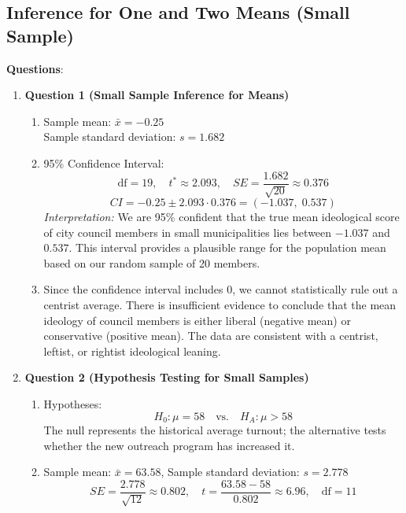 \documentclass{article}
\begin{document}

\subsection{Inference for One and Two Means (Small Sample)}

\textbf{Questions}:
\begin{enumerate}

  \item \textbf{Question 1 (Small Sample Inference for Means)}
  \begin{enumerate}[label=(\alph*)]
    \item Sample mean: $\bar{x} = -0.25$ \\
          Sample standard deviation: $s = 1.682$

    \item 95\% Confidence Interval:
    \[
    \text{df} = 19,\quad t^* \approx 2.093,\quad SE = \frac{1.682}{\sqrt{20}} \approx 0.376
    \]
    \[
    CI = -0.25 \pm 2.093 \cdot 0.376 = (-1.037,\; 0.537)
    \]
    \textit{Interpretation:} We are 95\% confident that the true mean ideological score of city council members in small municipalities lies between $-1.037$ and $0.537$. This interval provides a plausible range for the population mean based on our random sample of 20 members.

    \item Since the confidence interval includes $0$, we cannot statistically rule out a centrist average. There is insufficient evidence to conclude that the mean ideology of council members is either liberal (negative mean) or conservative (positive mean). The data are consistent with a centrist, leftist, or rightist ideological leaning.
  \end{enumerate}

  \item \textbf{Question 2 (Hypothesis Testing for Small Samples)}
  \begin{enumerate}[label=(\alph*)]
    \item Hypotheses:
    \[
    H_0: \mu = 58 \quad\text{vs.}\quad H_A: \mu > 58
    \]
    The null represents the historical average turnout; the alternative tests whether the new outreach program has increased it.

    \item Sample mean: $\bar{x} = 63.58$, Sample standard deviation: $s = 2.778$ \\
    \[
    SE = \frac{2.778}{\sqrt{12}} \approx 0.802,\quad
    t = \frac{63.58 - 58}{0.802} \approx 6.96,\quad
    \text{df} = 11
    \]


\end{enumerate}
\end{enumerate}
\end{document}
